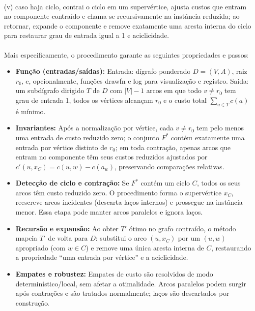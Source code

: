 \documentclass[12pt,a4paper]{article}
\def\texttt#1{#1}%
\def\emph#1{#1}%
\def\_{}%
\begin{document}
\paragraph{}
(v) caso haja ciclo, contrai o ciclo em um supervértice, ajusta custos que \emph{entram} no componente contraído e chama‑se recursivamente na instância reduzida; ao retornar, expande o componente e remove exatamente uma aresta interna do ciclo para restaurar grau de entrada igual a 1 e aciclicidade.

\paragraph{}
Mais especificamente, o procedimento garante as seguintes propriedades e passos:
\begin{itemize}\setlength{\itemsep}{2pt}
    \item \textbf{Função (entradas/saídas):} Entrada: dígrafo ponderado \(D=(V,A)\), raiz \(r_0\), e, opcionalmente, funções \texttt{draw\_fn} e \texttt{log} para visualização e registro. Saída: um subdígrafo dirigido \(T\) de \(D\) com \(|V|-1\) arcos em que todo \(v\neq r_0\) tem grau de entrada 1, todos os vértices alcançam \(r_0\) e o custo total \(\sum_{a\in T} c(a)\) é mínimo.
    \item \textbf{Invariantes:} Após a normalização por vértice, cada \(v\neq r_0\) tem pelo menos uma entrada de custo reduzido zero; o conjunto \(F^*\) contém exatamente uma entrada por vértice distinto de \(r_0\); em toda contração, apenas arcos que \emph{entram} no componente têm seus custos reduzidos ajustados por \(c'(u,x_C)=c(u,w)-c(a_w)\), preservando comparações relativas.
    \item \textbf{Detecção de ciclo e contração:} Se \(F^*\) contém um ciclo \(C\), todos os seus arcos têm custo reduzido zero. O procedimento forma o supervértice \(x_C\), reescreve arcos incidentes (descarta laços internos) e prossegue na instância menor. Essa etapa pode manter arcos paralelos e ignora laços.
    \item \textbf{Recursão e expansão:} Ao obter \(T'\) ótimo no grafo contraído, o método mapeia \(T'\) de volta para \(D\): substitui o arco \((u,x_C)\) por um \((u,w)\) apropriado (com \(w\in C\)) e remove uma única aresta interna de \(C\), restaurando a propriedade “uma entrada por vértice” e a aciclicidade.
    \item \textbf{Empates e robustez:} Empates de custo são resolvidos de modo determinístico/local, sem afetar a otimalidade. Arcos paralelos podem surgir após contrações e são tratados normalmente; laços são descartados por construção.

\end{itemize}
\end{document}
